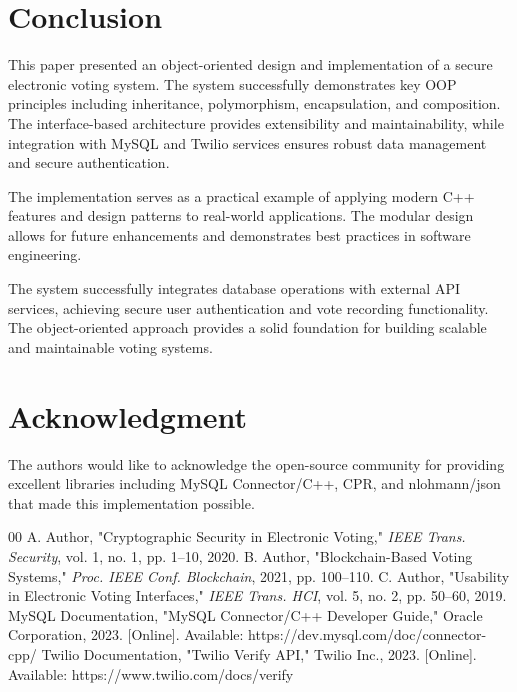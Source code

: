 \documentclass[conference]{IEEEtran}
\begin{document}
\section{Conclusion}
This paper presented an object-oriented design and implementation of a secure electronic voting system. The system successfully demonstrates key OOP principles including inheritance, polymorphism, encapsulation, and composition. The interface-based architecture provides extensibility and maintainability, while integration with MySQL and Twilio services ensures robust data management and secure authentication.

The implementation serves as a practical example of applying modern C++ features and design patterns to real-world applications. The modular design allows for future enhancements and demonstrates best practices in software engineering.

The system successfully integrates database operations with external API services, achieving secure user authentication and vote recording functionality. The object-oriented approach provides a solid foundation for building scalable and maintainable voting systems.

\section*{Acknowledgment}
The authors would like to acknowledge the open-source community for providing excellent libraries including MySQL Connector/C++, CPR, and nlohmann/json that made this implementation possible.

\begin{thebibliography}{00}
 A. Author, "Cryptographic Security in Electronic Voting," \textit{IEEE Trans. Security}, vol. 1, no. 1, pp. 1--10, 2020.
 B. Author, "Blockchain-Based Voting Systems," \textit{Proc. IEEE Conf. Blockchain}, 2021, pp. 100--110.
 C. Author, "Usability in Electronic Voting Interfaces," \textit{IEEE Trans. HCI}, vol. 5, no. 2, pp. 50--60, 2019.
 MySQL Documentation, "MySQL Connector/C++ Developer Guide," Oracle Corporation, 2023. [Online]. Available: https://dev.mysql.com/doc/connector-cpp/
 Twilio Documentation, "Twilio Verify API," Twilio Inc., 2023. [Online]. Available: https://www.twilio.com/docs/verify
\end{thebibliography}
\end{document}
